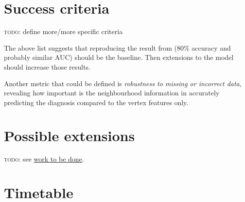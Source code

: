 \documentclass[12pt,a4paper,twoside]{article}
\begin{document}
\section*{Success criteria}



\textsc{todo}: define more/more specific criteria

The above list suggests that reproducing the result from \cite{parisot2018disease} (80\% accuracy and probably similar AUC) should be the baseline. Then extensions to the model should increase those results.

Another metric that could be defined is \textit{robustness to missing or incorrect data}, revealing how important is the neighbourhood information in accurately predicting the diagnosis compared to the vertex features only.

\section*{Possible extensions}



\textsc{todo}: see \hyperref[section:work]{work to be done}.

\section*{Timetable}
\label{section:timetable}

\end{document}
